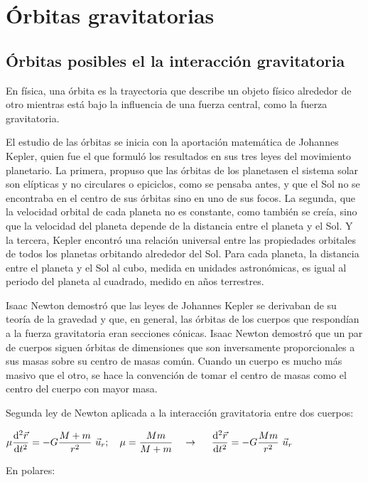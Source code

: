 \chapter{Órbitas gravitatorias}

\section{Órbitas posibles el la interacción gravitatoria}
\begin{miparrafo}
	En física, una órbita es la trayectoria que describe un objeto físico alrededor de otro mientras está bajo la influencia de una fuerza central, como la fuerza gravitatoria.

El estudio de las órbitas se inicia con la aportación matemática de Johannes Kepler, quien fue el que formuló los resultados en sus tres leyes del movimiento planetario. La primera, propuso que las órbitas de los planetasen el sistema solar son elípticas y no circulares o epiciclos, como se pensaba antes, y que el Sol no se encontraba en el centro de sus órbitas sino en uno de sus focos. La segunda, que la velocidad orbital de cada planeta no es constante, como también se creía, sino que la velocidad del planeta depende de la distancia entre el planeta y el Sol. Y la tercera, Kepler encontró una relación universal entre las propiedades orbitales de todos los planetas orbitando alrededor del Sol. Para cada planeta, la distancia entre el planeta y el Sol al cubo, medida en unidades astronómicas, es igual al periodo del planeta al cuadrado, medido en años terrestres.

Isaac Newton demostró que las leyes de Johannes Kepler se derivaban de su teoría de la gravedad y que, en general, las órbitas de los cuerpos que respondían a la fuerza gravitatoria eran secciones cónicas. Isaac Newton demostró que un par de cuerpos siguen órbitas de dimensiones que son inversamente proporcionales a sus masas sobre su centro de masas común. Cuando un cuerpo es mucho más masivo que el otro, se hace la convención de tomar el centro de masas como el centro del cuerpo con mayor masa.
\end{miparrafo}

Segunda ley de Newton aplicada a la interacción gravitatoria entre dos cuerpos:

$\displaystyle \mu \dv[2]{\vec r}{t}=-G \dfrac{M+m}{r^2} \ \vec u_r ;\quad \mu=\dfrac{Mm}{M+m} \quad \to \ \quad \dv[2]{\vec r}{t}=-G \dfrac{Mm}{r^2} \ \vec u_r$

En polares: 

